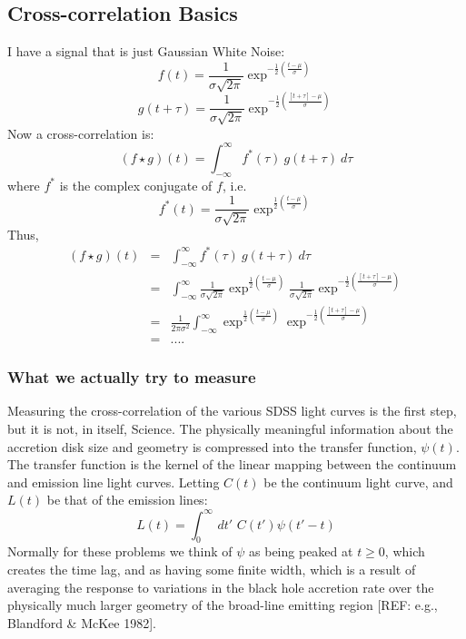 \documentclass[11pt,a4paper]{article}
\begin{document}
   \subsection{Cross-correlation Basics}
   I have a signal that is just Gaussian White Noise:
   \begin{equation}
     f(t)=\frac{1}{\sigma\sqrt{2\pi}}\exp^{-\frac{1}{2}(\frac{t-\mu}{\sigma})}     
   \end{equation}
  \begin{equation}
    g(t+\tau)=\frac{1}{\sigma\sqrt{2\pi}}\exp^{-\frac{1}{2}(\frac{[t+\tau]-\mu}{\sigma})}     
  \end{equation}
  Now a cross-correlation is: 
 \begin{equation}
   (f \star g)(t) = \int^{\infty}_{-\infty} f^{*}(\tau) \ g(t+\tau) \ d\tau
 \end{equation}
 where $f^{*}$ is the  complex conjugate of $f$, i.e. 
  \begin{equation}
    f^{*}(t)=\frac{1}{\sigma\sqrt{2\pi}}\exp^{\frac{1}{2}(\frac{t-\mu}{\sigma})}     
 \end{equation}
 Thus, 
 \begin{eqnarray}
  (f \star g)(t) & = & \int^{\infty}_{-\infty} f^{*}(\tau) \ g(t+\tau) \ d\tau \\
                     & = & \int^{\infty}_{-\infty}  \frac{1}{\sigma\sqrt{2\pi}} \exp^{\frac{1}{2}(\frac{t-\mu}{\sigma})}     
                                                             \frac{1}{\sigma\sqrt{2\pi}} \exp^{-\frac{1}{2}(\frac{[t+\tau]-\mu}{\sigma})}     \\
                      &= & \frac{1}{2\pi\sigma^{2}}   \int^{\infty}_{-\infty}  \exp^{\frac{1}{2}(\frac{t-\mu}{\sigma})}   \exp^{-\frac{1}{2}(\frac{[t+\tau]-\mu}{\sigma})} \\
                      & = & ....
 \end{eqnarray}
 
 \subsubsection{What we actually try to measure}
 Measuring the cross-correlation of the various SDSS light curves is
 the first step, but it is not, in itself, Science. The physically
 meaningful information about the accretion disk size and geometry is
 compressed into the transfer function, $\psi(t)$. The transfer
 function is the kernel of the linear mapping between the continuum
 and emission line light curves. Letting $C(t)$ be the continuum light
 curve, and $L(t)$ be that of the emission lines:
 \begin{equation}
   L(t) = \int_0^{\infty}\,dt'\,\,C(t') \psi(t'-t)
 \end{equation}
 Normally for these problems we think of $\psi$ as being peaked at
 $t\geq 0$, which creates the time lag, and as having some finite
 width, which is a result of
 averaging the response to variations in the black hole accretion rate
 over the physically much larger geometry of the broad-line emitting
 region [REF: e.g., Blandford \& McKee 1982].
 
\end{document}
